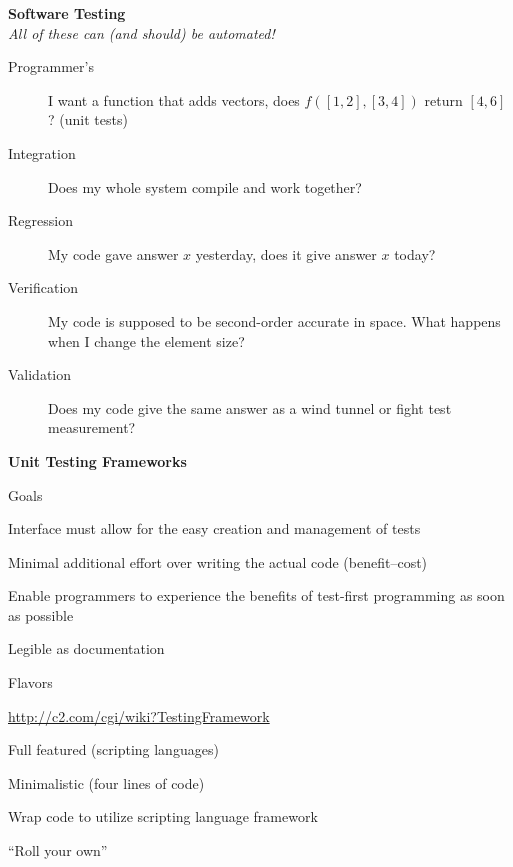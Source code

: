 \documentclass[landscape]{slides}
\renewcommand{\title}[1]{{\large\bfseries #1}}
\newenvironment{itemiz}%
  {\begin{list}{}{\raggedright
      \setlength{\itemsep}{2pt}%
      \setlength{\parskip}{4pt}\setlength{\parsep}{2pt}}}%
  {\end{list}}%
\begin{document}
 \begin{slide}
   \title{Software Testing} \\
   \emph{All of these can (and should) be automated!}
   \begin{description}
   \item[Programmer's] I want a function that adds vectors, does 
   $f([1, 2], [3, 4])$ return $[4, 6]$? (unit tests)
   \item[Integration] Does my whole system compile and work together?
   \item[Regression] My code gave answer $x$ yesterday, does it give
   answer $x$ today?
   \item[Verification] My code is supposed to be second-order accurate
   in space. What happens when I change the element size?
   \item[Validation] Does my code give the same answer as a wind
   tunnel or fight test measurement?
   \end{description}
 \end{slide}
 
 \begin{slide}
   \title{Unit Testing Frameworks}
   \begin{itemiz}
   \item Goals
     \begin{itemiz}
     \item Interface must allow for the easy creation and management of tests
     \item Minimal additional effort over writing the actual code
     (benefit--cost)
     \item Enable programmers to experience the benefits of test-first
       programming as soon as possible
     \item Legible as documentation
     \end{itemiz}
   \item Flavors
     \begin{itemiz}
     \item \url{http://c2.com/cgi/wiki?TestingFramework}
     \item Full featured (scripting languages)
     \item Minimalistic (four lines of code)
     \item Wrap code to utilize scripting language framework
     \item ``Roll your own''
     \end{itemiz}
   \end{itemiz}
 \end{slide}
 
\end{document}
